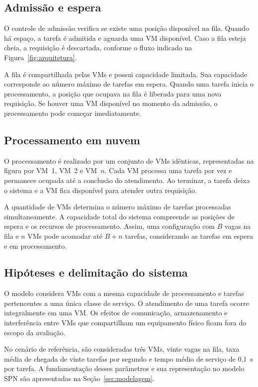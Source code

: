 \documentclass[conference]{IEEEtran}
\begin{document}
\subsection{Admissão e espera}

O controle de admissão verifica se existe uma posição
disponível na fila. Quando há espaço, a tarefa é admitida e
aguarda uma VM disponível. Caso a fila esteja cheia, a
requisição é descartada, conforme o fluxo indicado na
Figura~\ref{fig:arquitetura}.

A fila é compartilhada pelas VMs e possui capacidade limitada.
Sua capacidade corresponde ao número máximo de tarefas em
espera. Quando uma tarefa inicia o processamento, a posição
que ocupava na fila é liberada para uma nova requisição.
Se houver uma VM disponível no momento da admissão, o
processamento pode começar imediatamente.

\subsection{Processamento em nuvem}

O processamento é realizado por um conjunto de VMs idênticas,
representadas na figura por VM~1, VM~2 e VM~$n$. Cada VM
processa uma tarefa por vez e permanece ocupada até a
conclusão do atendimento. Ao terminar, a tarefa deixa o
sistema e a VM fica disponível para atender outra requisição.

A quantidade de VMs determina o número máximo de tarefas
processadas simultaneamente. A capacidade total do sistema
compreende as posições de espera e os recursos de
processamento. Assim, uma configuração com $B$ vagas na fila
e $n$ VMs pode acomodar até $B+n$ tarefas, considerando as
tarefas em espera e em processamento.

\subsection{Hipóteses e delimitação do sistema}

O modelo considera VMs com a mesma capacidade de processamento
e tarefas pertencentes a uma única classe de serviço. O
atendimento de uma tarefa ocorre integralmente em uma VM.
Os efeitos de comunicação, armazenamento e interferência
entre VMs que compartilham um equipamento físico ficam fora
do escopo da avaliação.

No cenário de referência, são consideradas três VMs, vinte
vagas na fila, taxa média de chegada de vinte tarefas por
segundo e tempo médio de serviço de 0,1~s por tarefa. A
fundamentação desses parâmetros e sua representação no
modelo SPN são apresentadas na Seção~\ref{sec:modelagem}.
\end{document}

